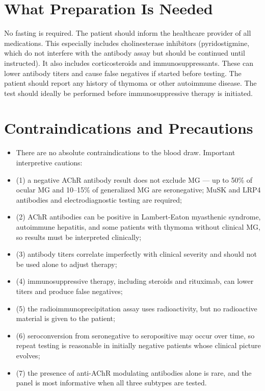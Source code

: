 \section*{What Preparation Is Needed}
No fasting is required. The patient should inform the healthcare provider of all medications. This especially includes cholinesterase inhibitors (pyridostigmine, which do not interfere with the antibody assay but should be continued until instructed). It also includes corticosteroids and immunosuppressants. These can lower antibody titers and cause false negatives if started before testing. The patient should report any history of thymoma or other autoimmune disease. The test should ideally be performed before immunosuppressive therapy is initiated.

\section*{Contraindications and Precautions}
\begin{itemize}
  \item There are no absolute contraindications to the blood draw. Important interpretive cautions:
  \item (1) a negative AChR antibody result does not exclude MG --- up to 50\% of ocular MG and 10--15\% of generalized MG are seronegative; MuSK and LRP4 antibodies and electrodiagnostic testing are required;
  \item (2) AChR antibodies can be positive in Lambert-Eaton myasthenic syndrome, autoimmune hepatitis, and some patients with thymoma without clinical MG, so results must be interpreted clinically;
  \item (3) antibody titers correlate imperfectly with clinical severity and should not be used alone to adjust therapy;
  \item (4) immunosuppressive therapy, including steroids and rituximab, can lower titers and produce false negatives;
  \item (5) the radioimmunoprecipitation assay uses radioactivity, but no radioactive material is given to the patient;
  \item (6) seroconversion from seronegative to seropositive may occur over time, so repeat testing is reasonable in initially negative patients whose clinical picture evolves;
  \item (7) the presence of anti-AChR modulating antibodies alone is rare, and the panel is most informative when all three subtypes are tested.
\end{itemize}
